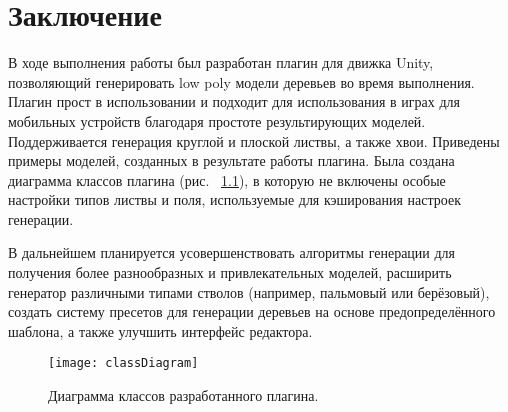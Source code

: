 \chapter{Заключение}
 
В ходе выполнения работы был разработан плагин для движка Unity, позволяющий генерировать low poly модели деревьев во время выполнения. Плагин прост в использовании и подходит для использования в играх для мобильных устройств благодаря простоте результирующих моделей. Поддерживается генерация круглой и плоской листвы, а также хвои. Приведены примеры моделей, созданных в результате работы плагина. Была создана диаграмма классов плагина (рис. ~\ref{classDiagram}), в которую не включены особые настройки типов листвы и поля, используемые для кэширования настроек генерации.

В дальнейшем планируется усовершенствовать алгоритмы генерации для получения более разнообразных и привлекательных моделей, расширить генератор различными типами стволов (например, пальмовый или берёзовый), создать систему пресетов для генерации деревьев на основе предопределённого шаблона, а также улучшить интерфейс редактора.
 
\begin{figure}[h]
    \centering
    \texttt{[image: classDiagram]}
    \caption{Диаграмма классов разработанного плагина.}
    \label{classDiagram}
\end{figure}
